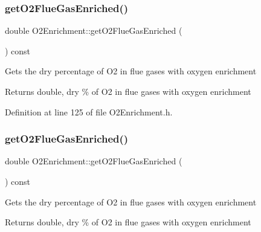 \mbox{\label{class_o2_enrichment_a274eddb78560dd502a3c5947ac7e6b96}} 
\subsubsection{\texorpdfstring{get\+O2\+Flue\+Gas\+Enriched()}{getO2FlueGasEnriched()}\hspace{0.1cm}{\footnotesize\ttfamily [1/3]}}
{\footnotesize\ttfamily double O2\+Enrichment\+::get\+O2\+Flue\+Gas\+Enriched (\begin{DoxyParamCaption}{ }\end{DoxyParamCaption}) const\hspace{0.3cm}{\ttfamily [inline]}}

Gets the dry percentage of O2 in flue gases with oxygen enrichment \begin{DoxyReturn}{Returns}
double, dry \% of O2 in flue gases with oxygen enrichment 
\end{DoxyReturn}


Definition at line 125 of file O2\+Enrichment.\+h.

\mbox{\label{class_o2_enrichment_a274eddb78560dd502a3c5947ac7e6b96}} 
\subsubsection{\texorpdfstring{get\+O2\+Flue\+Gas\+Enriched()}{getO2FlueGasEnriched()}\hspace{0.1cm}{\footnotesize\ttfamily [2/3]}}
{\footnotesize\ttfamily double O2\+Enrichment\+::get\+O2\+Flue\+Gas\+Enriched (\begin{DoxyParamCaption}{ }\end{DoxyParamCaption}) const\hspace{0.3cm}{\ttfamily [inline]}}

Gets the dry percentage of O2 in flue gases with oxygen enrichment \begin{DoxyReturn}{Returns}
double, dry \% of O2 in flue gases with oxygen enrichment 
\end{DoxyReturn}


